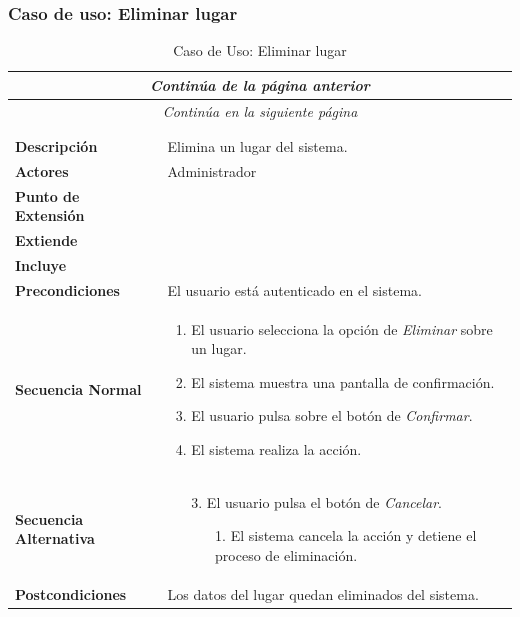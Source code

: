 \subsubsection*{Caso de uso: Eliminar lugar }
\begin{longtable}{| p{4cm} | p{10cm} |}
\endfirsthead
\multicolumn{2}{c}{\textit{Continúa de la página anterior}}\\[12pt]
\hline
\endhead
\hline
\multicolumn{2}{c}{\textit{Continúa en la siguiente página}} \\
\endfoot
\hline
\caption{Caso de Uso: Eliminar lugar}\label{fig:1}\\
\endlastfoot


\hline
\multicolumn{2}{|c|}{\textbf{CU$<$37$>$ - Eliminar Lugar}} \\

\hline
\textbf{Descripción} &
Elimina un lugar del sistema.\\

\hline
\textbf{Actores} &
Administrador\\

\hline
\textbf{Punto de Extensión} &
\\

\hline
\textbf{Extiende} &
\\

\hline
\textbf{Incluye} &
\\

\hline
\textbf{Precondiciones} &
El usuario está autenticado en el sistema.\\

\hline
\textbf{Secuencia Normal} &\mbox{}\par\vspace{-\baselineskip}
\begin{enumerate}[leftmargin=0.7cm, topsep=0.1cm]
\item El usuario selecciona la opción de \textit{Eliminar} sobre un lugar.
\item El sistema muestra una pantalla de confirmación.
\item El usuario pulsa sobre el botón de \textit{Confirmar}.
\item El sistema realiza la acción.
\end{enumerate}


\\
\hline
\textbf{Secuencia Alternativa} &\mbox{}\par\vspace{-\baselineskip}
\begin{enumerate}[leftmargin=0.9cm, topsep=0.1cm]
\item[3.] El usuario pulsa el botón de \textit{Cancelar}.
	\begin{itemize}
	\item[1.] El sistema cancela la acción y detiene el proceso de eliminación.
	\end{itemize}
\end{enumerate}
\\

\hline
\textbf{Postcondiciones} & 
Los datos del lugar quedan eliminados del sistema.\\
\hline
\end{longtable}



